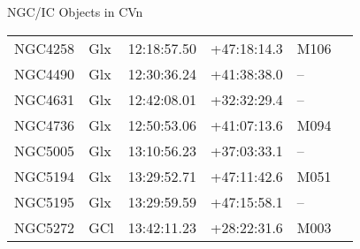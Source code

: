 \begin{block}{NGC/IC Objects in CVn}
  \centering
  \begin{tabularx}{\textwidth}{llrrll} 
    NGC4258 & Glx & 12:18:57.50 & +47:18:14.3  & M106 \\ 
    NGC4490 & Glx & 12:30:36.24 & +41:38:38.0  & -- \\ 
    NGC4631 & Glx & 12:42:08.01 & +32:32:29.4  & -- \\ 
    NGC4736 & Glx & 12:50:53.06 & +41:07:13.6  & M094 \\ 
    NGC5005 & Glx & 13:10:56.23 & +37:03:33.1  & -- \\ 
    NGC5194 & Glx & 13:29:52.71 & +47:11:42.6  & M051 \\ 
    NGC5195 & Glx & 13:29:59.59 & +47:15:58.1  & -- \\ 
    NGC5272 & GCl & 13:42:11.23 & +28:22:31.6  & M003 \\ 
  \end{tabularx}
\end{block}